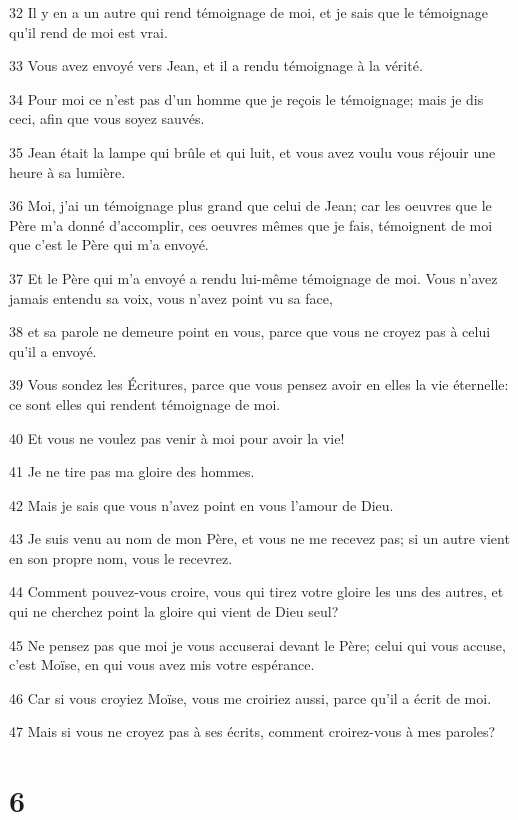 \par 32 Il y en a un autre qui rend témoignage de moi, et je sais que le témoignage qu'il rend de moi est vrai.
\par 33 Vous avez envoyé vers Jean, et il a rendu témoignage à la vérité.
\par 34 Pour moi ce n'est pas d'un homme que je reçois le témoignage; mais je dis ceci, afin que vous soyez sauvés.
\par 35 Jean était la lampe qui brûle et qui luit, et vous avez voulu vous réjouir une heure à sa lumière.
\par 36 Moi, j'ai un témoignage plus grand que celui de Jean; car les oeuvres que le Père m'a donné d'accomplir, ces oeuvres mêmes que je fais, témoignent de moi que c'est le Père qui m'a envoyé.
\par 37 Et le Père qui m'a envoyé a rendu lui-même témoignage de moi. Vous n'avez jamais entendu sa voix, vous n'avez point vu sa face,
\par 38 et sa parole ne demeure point en vous, parce que vous ne croyez pas à celui qu'il a envoyé.
\par 39 Vous sondez les Écritures, parce que vous pensez avoir en elles la vie éternelle: ce sont elles qui rendent témoignage de moi.
\par 40 Et vous ne voulez pas venir à moi pour avoir la vie!
\par 41 Je ne tire pas ma gloire des hommes.
\par 42 Mais je sais que vous n'avez point en vous l'amour de Dieu.
\par 43 Je suis venu au nom de mon Père, et vous ne me recevez pas; si un autre vient en son propre nom, vous le recevrez.
\par 44 Comment pouvez-vous croire, vous qui tirez votre gloire les uns des autres, et qui ne cherchez point la gloire qui vient de Dieu seul?
\par 45 Ne pensez pas que moi je vous accuserai devant le Père; celui qui vous accuse, c'est Moïse, en qui vous avez mis votre espérance.
\par 46 Car si vous croyiez Moïse, vous me croiriez aussi, parce qu'il a écrit de moi.
\par 47 Mais si vous ne croyez pas à ses écrits, comment croirez-vous à mes paroles?

\chapter{6}


